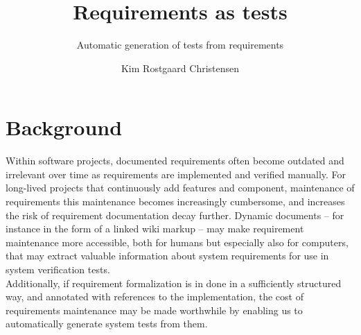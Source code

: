 \documentclass[10pt]{scrartcl}
\author{Kim Rostgaard Christensen}
\title{Requirements as tests}
\subtitle{Automatic generation of tests from requirements}
\begin{document}
\maketitle

\section*{Background}
Within software projects, documented requirements often become outdated and irrelevant over time as requirements are implemented and verified manually. For long-lived projects that continuously add features and component, maintenance of requirements this maintenance becomes increasingly cumbersome, and increases the risk of requirement documentation decay further. Dynamic documents -- for instance in the form of a linked wiki markup -- may make requirement maintenance more accessible, both for humans but especially also for computers, that may extract valuable information about system requirements for use in system verification tests.\\
Additionally, if requirement formalization is in done in a sufficiently structured way, and annotated with references to the implementation, the cost of requirements maintenance may be made worthwhile by enabling us to automatically generate system tests from them. 
\end{document}
